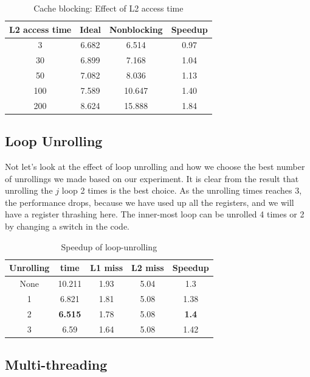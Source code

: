 \documentclass[twocolumn,letterpaper,10pt]{article}
\begin{document}
\begin{table}[ht!]
\begin{center}
\begin{tabular}{cccc}
\toprule
L2 access time & Ideal	& Nonblocking & Speedup\\
\midrule
3 &	6.682 & 6.514 & 0.97 \\ 
30 & 6.899  & 7.168 & 1.04 \\ 
50	& 7.082	& 8.036 & 1.13  \\ 
100	& 7.589	& 10.647 & 1.40 \\ 
200	& 8.624	& 15.888 & 1.84\\
\bottomrule
\end{tabular}
\end{center}
\caption{Cache blocking: Effect of L2 access time}
\end{table}


\subsection{Loop Unrolling}

Not let's look at the effect of loop unrolling and how we choose the
best number of unrollings we made based on our experiment. It is clear
from the result that unrolling the $j$ loop 2 times is the best
choice. As the unrolling times reaches 3, the performance drops,
because we have used up all the registers, and we will have a register
thrashing here. The inner-most loop can be unrolled 4 times or 2 by
changing a switch in the code.

\begin{table}[ht!]
\begin{center}
\begin{tabular}{ccccc}
\toprule
Unrolling & time & L1 miss  & L2 miss & Speedup \\
\midrule
None & 10.211 & 1.93 & 5.04	& 1.3 \\
1 & 6.821 & 1.81 & 5.08 & 1.38 \\
2 & \textbf{6.515} & 1.78 & 5.08 & \textbf{1.4} \\
3 &	6.59 & 1.64	& 5.08 & 1.42 \\
\bottomrule
\end{tabular}
\end{center}
\caption{Speedup of loop-unrolling}
\label{fig:unrolling}
\end{table}


\subsection{Multi-threading}
\end{document}
